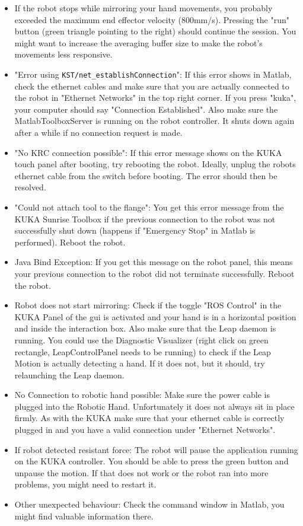 \documentclass[headsepline,footinclude=false,fontsize=11pt,paper=a4,listof=totoc,bibliography=totoc,BCOR=12mm,DIV=14]{scrbook}
\begin{document}
\begin{itemize}
	\item If the robot stops while mirroring your hand movements, you probably exceeded the maximum end effector velocity (800mm/s). Pressing the "run" button (green triangle pointing to the right) should continue the session. You might want to increase the averaging buffer size to make the robot's movements less responsive. 
	\item "Error using \texttt{KST/net\_establishConnection}": If this error shows in Matlab, check the ethernet cables and make sure that you are actually connected to the robot in "Ethernet Networks" in the top right corner. If you press "kuka", your computer should say "Connection Established". Also make sure the MatlabToolboxServer is running on the robot controller. It shuts down again after a while if no connection request is made. 
	\item "No KRC connection possible": If this error message shows on the KUKA touch panel after booting, try rebooting the robot. Ideally, unplug the robots ethernet cable from the switch before booting. The error should then be resolved.
	\item "Could not attach tool to the flange": You get this error message from the KUKA Sunrise Toolbox if the previous connection to the robot was not successfully shut down (happens if  "Emergency Stop" in Matlab is performed). Reboot the robot.
	\item Java Bind Exception: If you get this message on the robot panel, this means your previous connection to the robot did not terminate successfully. Reboot the robot.
	\item Robot does not start mirroring: Check if the toggle "ROS Control" in the KUKA Panel of the \gls{gui} is activated and your hand is in a horizontal position and inside the interaction box. Also make sure that the Leap daemon is running. You could use the Diagnostic Visualizer (right click on green rectangle, LeapControlPanel needs to be running) to check if the Leap Motion is actually detecting a hand. If it does not, but it should, try relaunching the Leap daemon.
	\item No Connection to robotic hand possible: Make sure the power cable is plugged into the Robotic Hand. Unfortunately it does not always sit in place firmly. As with the KUKA make sure that your ethernet cable is correctly plugged in and you have a valid connection under "Ethernet Networks".
	\item If robot detected resistant force: The robot will pause the application running on the KUKA controller. You should be able to press the green button and unpause the motion. If that does not work or the robot ran into more problems, you might need to restart it.
	\item Other unexpected behaviour: Check the command window in Matlab, you might find valuable information there.
\end{itemize}
\end{document}
